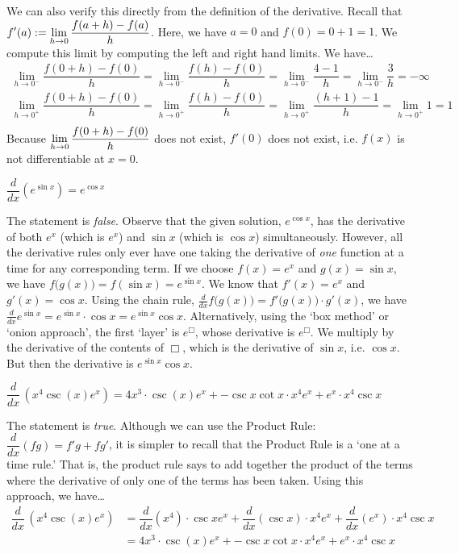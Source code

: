 \documentclass[11pt,letterpaper]{article}
\begin{document}
We can also verify this directly from the definition of the derivative. Recall that $\displaystyle f'(a):= \lim_{h \to 0} \dfrac{f(a + h) - f(a)}{h}$. Here, we have $a= 0$ and $f(0)= 0 + 1= 1$. We compute this limit by computing the left and right hand limits. We have\dots
	\[
	\begin{aligned}
	\lim_{h \to 0^-} \dfrac{f(0 + h) - f(0)}{h}= \lim_{h \to 0^-} \dfrac{f(h) - f(0)}{h}= \lim_{h \to 0^-} \dfrac{4 - 1}{h}= \lim_{h \to 0^-} \dfrac{3}{h}= -\infty \\[0.3cm]
	\lim_{h \to 0^+} \dfrac{f(0 + h) - f(0)}{h}= \lim_{h \to 0^+} \dfrac{f(h) - f(0)}{h}= \lim_{h \to 0^+} \dfrac{(h + 1) - 1}{h}= \lim_{h \to 0^+} 1= 1 \\
	\end{aligned}
	\]
Because $\displaystyle \lim_{h \to 0} \dfrac{f(0 + h) - f(0)}{h}$ does not exist, $f'(0)$ does not exist, i.e. $f(x)$ is not differentiable at $x= 0$. \pvspace{1.3cm}



 $\dfrac{d}{dx} \left( e^{\sin x} \right)= e^{\cos x}$ \pspace

\sol The statement is \textit{false}. Observe that the given solution, $e^{\cos x}$, has the derivative of both $e^x$ (which is $e^x$) and $\sin x$ (which is $\cos x$) simultaneously. However, all the derivative rules only ever have one taking the derivative of \textit{one} function at a time for any corresponding term. If we choose $f(x)= e^x$ and $g(x)= \sin x$, we have $f \big( g(x) \big)= f(\sin x)= e^{\sin x}$. We know that $f'(x)= e^x$ and $g'(x)= \cos x$. Using the chain rule, $\tfrac{d}{dx} f \big( g(x) \big)= f' \big( g(x) \big) \cdot g'(x)$, we have $\tfrac{d}{dx} e^{\sin x}= e^{\sin x} \cdot \cos x= e^{\sin x} \cos x$. Alternatively, using the `box method' or `onion approach', the first `layer' is $e^\Box{}$, whose derivative is $e^\Box{}$. We multiply by the derivative of the contents of $\Box{}$, which is the derivative of $\sin x$, i.e. $\cos x$. But then the derivative is $e^{\sin x} \cos x$. \pvspace{1.3cm}



 $\dfrac{d}{dx} \,\left( x^4 \csc(x) e^x \right)= 4x^3 \cdot \csc(x) e^x + -\csc x \cot x \cdot x^4 e^x + e^x \cdot x^4 \csc x$ \pspace

\sol The statement is \textit{true}. Although we can use the Product Rule: $\dfrac{d}{dx} (fg)= f'g + fg'$, it is simpler to recall that the Product Rule is a `one at a time rule.' That is, the product rule says to add together the product of the terms where the derivative of only one of the terms has been taken. Using this approach, we have\dots
	\[
	\begin{aligned}
	\dfrac{d}{dx} \,\left( x^4 \csc(x) e^x \right)&= \dfrac{d}{dx} (x^4) \cdot \csc x e^x + \dfrac{d}{dx} (\csc x) \cdot x^4 e^x + \dfrac{d}{dx}(e^x) \cdot x^4 \csc x \\[0.3cm]
	&= 4x^3 \cdot \csc(x) e^x + -\csc x \cot x \cdot x^4 e^x + e^x \cdot x^4 \csc x
	\end{aligned}
	\] \pvspace{1.3cm}
\end{document}

